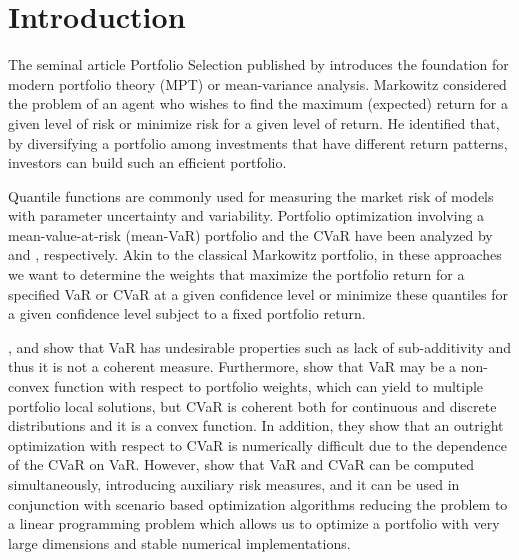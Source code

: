 \documentclass[a4paper,10pt]{article}
\begin{document}
\makeatletter

\makeatother

 


\section{Introduction}

\label{introduction}

The seminal article Portfolio Selection published by  \citet*{
	markowitz1952} introduces the foundation for modern portfolio theory (MPT) or mean-variance analysis. Markowitz considered the problem of an agent who wishes to find the maximum (expected) return for a given level of risk or minimize risk for a given level of return. He identified that, by diversifying a portfolio among investments
that have different return patterns, investors can build such an efficient
portfolio.

Quantile functions are commonly used for measuring the market risk of models
with parameter uncertainty and variability. Portfolio optimization involving
a mean-value-at-risk (mean-VaR) portfolio and the CVaR have been analyzed by %
\citet*{alexander2002} and \citet*{rockafellar2000}, respectively. Akin to
the classical Markowitz portfolio, in these approaches we want to determine
the weights that maximize the portfolio return for a specified VaR or CVaR
at a given confidence level or minimize these quantiles for a given
confidence level subject to a fixed portfolio return.

\citet{artzner1999}, \citet*{szego2005} and \citet*{zhu2009worst} show that VaR has undesirable properties such as lack
of sub-additivity and thus it is not a coherent measure. Furthermore, \citet*%
{uryasev2001} show that VaR may be a non-convex function with respect to
portfolio weights, which can yield to multiple portfolio local solutions,
but CVaR is coherent both for continuous and discrete distributions and it
is a convex function. In addition, they show that an outright optimization
with respect to CVaR is numerically difficult due to the dependence of the
CVaR on VaR. However, \citet*{rockafellar2000} show that VaR and CVaR can be
computed simultaneously, introducing auxiliary risk measures, and it can be
used in conjunction with scenario based optimization algorithms reducing the
problem to a linear programming problem which allows us to optimize a
portfolio with very large dimensions and stable numerical implementations.
\end{document}
